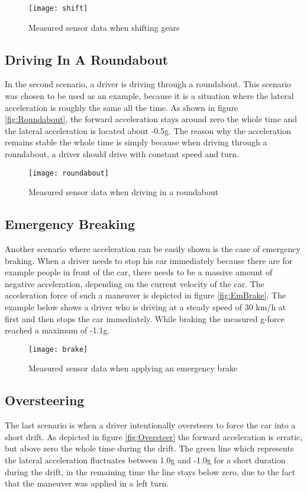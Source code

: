 \begin{figure}[H]
    \centering
    \texttt{[image: shift]}
    \caption{Measured sensor data when shifting gears}
    \label{fig:ShiftGears}
\end{figure}

\subsection{Driving In A Roundabout}
In the second scenario, a driver is driving through a roundabout. This scenario was chosen to be used as an example, because it is a situation where the lateral acceleration is roughly the same all the time. As shown in figure \vref{fig:Roundabout}, the forward acceleration stays around zero the whole time and the lateral acceleration is located about -0.5g. The reason why the acceleration remains stable the whole time is simply because when driving through a roundabout, a driver should drive with constant speed and turn.

\begin{figure}[H]
    \centering
    \texttt{[image: roundabout]}
    \caption{Measured sensor data when driving in a roundabout}
    \label{fig:Roundabout}
\end{figure}

\subsection{Emergency Breaking}
Another scenario where acceleration can be easily shown is the case of emergency braking. When a driver needs to stop his car immediately because there are for example people in front of the car, there needs to be a massive amount of negative acceleration, depending on the current velocity of the car. The acceleration force of such a maneuver is depicted in figure \vref{fig:EmBrake}. The example below shows  a driver who is driving at a steady speed of 30 km/h at first and then stops the car immediately. While braking the measured g-force reached a maximum of -1.1g.

\begin{figure}[H]
    \centering
    \texttt{[image: brake]}
    \caption{Measured sensor data when applying an emergency brake}
    \label{fig:EmBrake}
\end{figure}

\subsection{Oversteering}
The last scenario is when a driver intentionally oversteers to force the car into a short drift. As depicted in figure \vref{fig:Oversteer} the forward acceleration is erratic, but above zero the whole time during the drift. The green line which represents the lateral acceleration fluctuates between 1.0g and -1.0g for a short duration during the drift, in the remaining time the line stays below zero, due to the fact that the maneuver was applied in a left turn.

